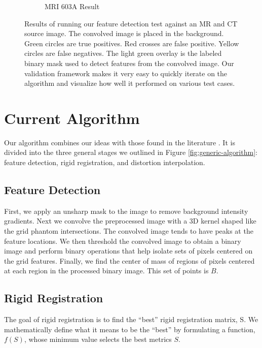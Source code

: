 \documentclass[12pt]{article}
\begin{document}
\begin{figure}
\begin{subfigure}[b]{0.48\textwidth}
        \caption{MRI 603A Result}
        \label{fig:testing-feature-detection_2}
    \end{subfigure}
    \caption{Results of running our feature detection test against an MR and CT source image.  The convolved image is placed in the background.  Green circles are true positives.  Red crosses are false positive.  Yellow circles are false negatives.  The light green overlay is the labeled binary mask used to detect features from the convolved image.  Our validation framework makes it very easy to quickly iterate on the algorithm and visualize how well it performed on various test cases.}
    \label{fig:feature-detection-run}
\end{figure}

\section{Current Algorithm}

Our algorithm combines our ideas with those found in the literature \cite{stanescu2010,baldwin2007}.  It is divided into the three general stages we outlined in Figure \ref{fig:generic-algorithm}: feature detection, rigid registration, and distortion interpolation.

\subsection{Feature Detection}

First, we apply an unsharp mask to the image to remove background intensity gradients.  Next we convolve the preprocessed image with a 3D kernel shaped like the grid phantom intersections.  The convolved image tends to have peaks at the feature locations.  We then threshold the convolved image to obtain a binary image and perform binary operations that help isolate sets of pixels centered on the grid features.  Finally, we find the center of mass of regions of pixels centered at each region in the processed binary image.  This set of points is $B$.

\subsection{Rigid Registration}

The goal of rigid registration is to find the ``best'' rigid registration matrix, $\textrm{S}$.  We mathematically define what it means to be the ``best'' by formulating a function, $f(S)$, whose minimum value selects the best metrics $S$.
\end{document}
